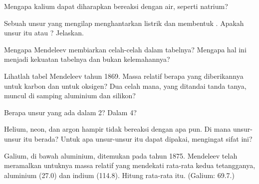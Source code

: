 \begin{exercise}[$\star\star$]\label{exo:g9:periodic-table-first-look:6}
Mengapa kalium dapat diharapkan bereaksi dengan air, seperti natrium?
\end{exercise}

\begin{exercise}[$\star\star$]\label{exo:g9:periodic-table-first-look:7}
Sebuah unsur yang mengilap menghantarkan listrik dan membentuk 
. Apakah unsur itu  atau ? Jelaskan.
\end{exercise}

\begin{exercise}[$\star\star$]\label{exo:g9:periodic-table-first-look:8}
Mengapa Mendeleev membiarkan celah-celah dalam tabelnya? Mengapa hal ini
menjadi kekuatan tabelnya dan bukan kelemahannya?
\end{exercise}

\begin{exercise}[$\star\star$]\label{exo:g9:periodic-table-first-look:9}
Lihatlah tabel Mendeleev tahun 1869. Massa  relatif berapa yang
diberikannya untuk karbon dan untuk oksigen? Dua celah mana, yang
ditandai tanda tanya, muncul di samping aluminium dan silikon?
\end{exercise}

\begin{exercise}[$\star\star$]\label{exo:g9:periodic-table-first-look:10}
Berapa unsur yang ada dalam  2? Dalam  4?
\end{exercise}

\begin{exercise}[$\star\star\star$]\label{exo:g9:periodic-table-first-look:11}
Helium, neon, dan argon hampir tidak bereaksi dengan apa pun. Di
 mana unsur-unsur itu berada? Untuk apa unsur-unsur itu dapat
dipakai, mengingat sifat ini?
\end{exercise}

\begin{exercise}[$\star\star\star$]\label{exo:g9:periodic-table-first-look:12}
Galium, di bawah aluminium, ditemukan pada tahun 1875. Mendeleev telah
meramalkan untuknya massa  relatif yang mendekati rata-rata kedua
tetangganya, aluminium (27.0) dan indium (114.8). Hitung rata-rata itu.
(Galium: 69.7.)
\end{exercise}

